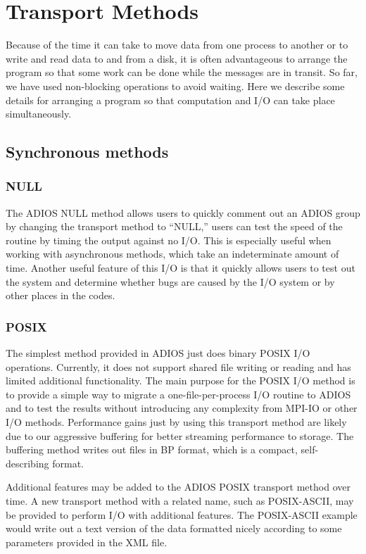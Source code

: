 \chapter{Transport Methods}
\label{chapter-methods}

Because of the time it can take to move data from one process to another or to 
write and read data to and from a disk, it is often advantageous to arrange the 
program so that some work can be done while the messages are in transit. So far, 
we have used non-blocking operations to avoid waiting. Here we describe some details 
for arranging a program so that computation and I/O can take place simultaneously.

\section{Synchronous methods}

\subsection{NULL}

The ADIOS NULL method allows users to quickly comment out an ADIOS group by changing 
the transport method to ``NULL,'' users can test the speed of the routine by timing 
the output against no I/O. This is especially useful when working with asynchronous 
methods, which take an indeterminate amount of time.  Another useful feature of 
this I/O is that it quickly allows users to test out the system and determine whether 
bugs are caused by the I/O system or by other places in the codes.

\subsection{POSIX}

The simplest method provided in ADIOS just does binary POSIX I/O operations. Currently, 
it does not support shared file writing or reading and has limited additional functionality. 
The main purpose for the POSIX I/O method is to provide a simple way to migrate 
a one-file-per-process I/O routine to ADIOS and to test the results without introducing 
any complexity from MPI-IO or other I/O methods. Performance gains just by using 
this transport method are likely due to our aggressive buffering for better streaming 
performance to storage. The buffering method writes out files in BP format, which 
is a compact, self-describing format. 

Additional features may be added to the ADIOS POSIX transport method over time. 
A new transport method with a related name, such as POSIX-ASCII, may be provided 
to perform I/O with additional features. The POSIX-ASCII example would write out 
a text version of the data formatted nicely according to some parameters provided 
in the XML file.

